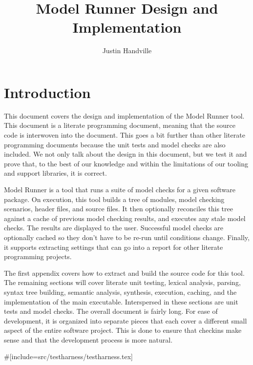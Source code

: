 \title{Model Runner Design and Implementation}
\author{Justin Handville}

\maketitle

\newpage

\tableofcontents

\newpage

\section{Introduction}

This document covers the design and implementation of the Model Runner tool.
This document is a literate programming document, meaning that the source code
is interwoven into the document. This goes a bit further than other literate
programming documents because the unit tests and model checks are also included.
We not only talk about the design in this document, but we test it and prove
that, to the best of our knowledge and within the limitations of our tooling and
support libraries, it is correct.

Model Runner is a tool that runs a suite of model checks for a given software
package. On execution, this tool builds a tree of modules, model checking
scenarios, header files, and source files. It then optionally reconciles this
tree against a cache of previous model checking results, and executes any stale
model checks.  The results are displayed to the user.  Successful model checks
are optionally cached so they don't have to be re-run until conditions change.
Finally, it supports extracting settings that can go into a report for other
literate programming projects.

The first appendix covers how to extract and build the source code for this
tool.  The remaining sections will cover literate unit testing, lexical
analysis, parsing, syntax tree building, semantic analysis, synthesis,
execution, caching, and the implementation of the main executable.  Interspersed
in these sections are unit tests and model checks.  The overall document is
fairly long.  For ease of development, it is organized into separate pieces that
each cover a different small aspect of the entire software project. This is done
to ensure that checkins make sense and that the development process is more
natural.

\newpage

#[include=src/testharness/testharness.tex]

